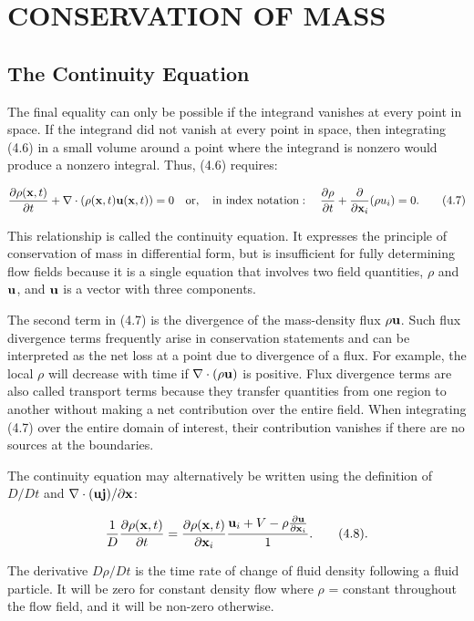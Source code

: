 \documentclass{article}
\begin{document}
\section{CONSERVATION OF MASS}

\subsection{The Continuity Equation}

The final equality can only be possible if the integrand vanishes at every point in space. If the integrand did not vanish at every point in space, then integrating (4.6) in a small volume around a point where the integrand is nonzero would produce a nonzero integral. Thus, (4.6) requires:

\[
\frac{\partial\rho({\bf x}, t)}{\partial t} + \nabla\cdot(\rho({\bf x}, t){\bf u}({\bf x}, t)) = 0 \quad\mathrm{or}, \quad\mathrm{i n ~ i n d e x ~ n o t a t i o n}: \quad\frac{\partial\rho}{\partial t} + \frac{\partial}{\partial {\bf x}_i}(\rho u_i) = 0. \tag{4.7}
\]

This relationship is called the continuity equation. It expresses the principle of conservation of mass in differential form, but is insufficient for fully determining flow fields because it is a single equation that involves two field quantities, $\rho$ and ${\bf u}$, and ${\bf u}$ is a vector with three components.

The second term in (4.7) is the divergence of the mass-density flux $\rho{\bf u}$. Such flux divergence terms frequently arise in conservation statements and can be interpreted as the net loss at a point due to divergence of a flux. For example, the local $\rho$ will decrease with time if $\nabla\cdot(\rho{\bf u})$ is positive. Flux divergence terms are also called transport terms because they transfer quantities from one region to another without making a net contribution over the entire field. When integrating (4.7) over the entire domain of interest, their contribution vanishes if there are no sources at the boundaries.

The continuity equation may alternatively be written using the definition of $D/Dt$ and $\nabla\cdot({\bf u}{\bf j})/\partial {\bf x}$:

\[
\frac{1}{D}\frac{\partial\rho({\bf x}, t)}{\partial t} = \frac{\partial\rho({\bf x}, t)}{\partial {\bf x}_i}\frac{{\bf u}_i + V - \rho\frac{\partial {\bf u}}{\partial {\bf x}_i}}{1}. \tag{4.8}.
\]

The derivative $D\rho/Dt$ is the time rate of change of fluid density following a fluid particle. It will be zero for constant density flow where $\rho$ = constant throughout the flow field, and it will be non-zero otherwise.
\end{document}
